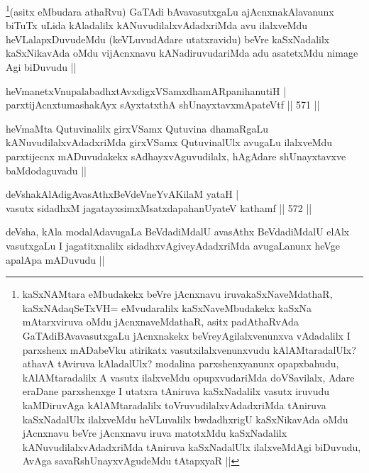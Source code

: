 \begin{artha}
\footnote{kaSxNAMtara eMbudakekx beVre jAcnxnavu iruvakaSxNaveMdathaR, kaSxNAdaqSeTxVH= eMvudaralilx kaSxNaveMbudakekx kaSxNa mAtarxviruva oMdu jAcnxnaveMdathaR, asitx padAthaRvAda GaTAdiBAvavasutxgaLu jAcnxnakekx beVreyAgilalxvenunxva vAdadalilx I parxshenx mADabeVku atirikatx vasutxilalxvenunxvudu kAlAMtaradalUlx? athavA tAviruva kAladalUlx? modalina parxshenxyanunx opapxbahudu, kAlAMtaradalilx A vasutx ilalxveMdu opupxvudariMda doVSavilalx, Adare eraDane parxshenxge I utatxra tAniruva kaSxNadalilx vasutx iruvudu kaMDiruvAga kAlAMtaradalilx toVruvudilalxvAdadxriMda tAniruva kaSxNadalUlx ilalxveMdu heVLuvalilx bwdadhxrigU kaSxNikavAda oMdu jAcnxnavu beVre jAcnxnavu iruva matotxMdu kaSxNadalilx kANuvudilalxvAdadxriMda tAniruva kaSxNadalUlx ilalxveMdAgi biDuvudu, AvAga savaRshUnayxvAgudeMdu tAtapxyaR ||}(asitx eMbudara athaRvu) GaTAdi bAvavasutxgaLu ajAcnxnakAlavanunx biTuTx uLida kAladalilx kANuvudilalxvAdadxriMda avu ilalxveMdu heVLalapxDuvudeMdu (keVLuvudAdare utatxravidu) beVre kaSxNadalilx kaSxNikavAda oMdu vijAcnxnavu kANadiruvudariMda adu asatetxMdu nimage Agi biDuvudu ||
\end{artha}


\begin{shl}
heVmanetxV\s nupalabadhxtAvxdigxVSamxdhamARpanihanutiH | \\
parxtijAcnxtumashakAyx sAyxtatxthA shUnayxtavxmApateVtf \hfill||  571 ||  
\end{shl}

\begin{artha}
heVmaMta Qutuvinalilx girxVSamx Qutuvina dhamaRgaLu kANuvudilalxvAdadxriMda girxVSamx QutuvinalUlx avugaLu ilalxveMdu parxtijecnx mADuvudakekx sAdhayxvAguvudilalx, hAgAdare shUnayxtavxve baMdodaguvadu ||
\end{artha}


\begin{shl}
deVshakAlAdigAvasAthxBeVdeVneYvAKilaM yataH | \\
vasutx sidadhxM jagatayxsimxMsatxdapahanUyateV kathamf \hfill||  572 ||  
\end{shl}

\begin{artha}
deVsha, kAla modalAdavugaLa BeVdadiMdalU avasAthx BeVdadiMdalU elAlx vasutxgaLu I jagatitxnalilx sidadhxvAgiveyAdadxriMda avugaLanunx heVge apalApa mADuvudu ||
\end{artha}

